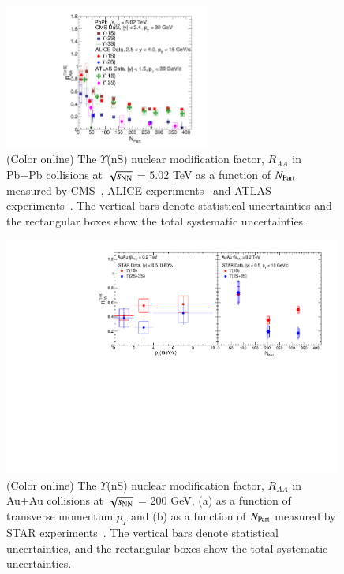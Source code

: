 \begin{figure}
  \begin{center}
  \includegraphics[width=0.6\textwidth]{Figures/Fig6_LHC_YnSRAANPart.pdf}
  \caption{(Color online) The $\Upsilon$(nS) nuclear modification factor, $R_{AA}$
   in Pb+Pb collisions at $\sqrt{s_{\rm NN}}$ = 5.02 TeV as a function of $N_{\rm Part}$
   measured by CMS~\cite{CMS:2018zza}, ALICE experiments~\cite{ALICE:2020wwx} and
   ATLAS experiments~\cite{ALICE:2020wwx}.
   The vertical bars denote statistical uncertainties and the rectangular boxes show
   the total systematic uncertainties.
  }
  \label{fig:LHCYnSRAANPart}
  \end{center}
\end{figure}



\begin{figure}
  \includegraphics[width=0.99\textwidth]{Figures/Fig7_RHIC_YnSRAAPt.pdf}
  \caption{(Color online) The $\Upsilon$(nS) nuclear modification factor, $R_{AA}$
in Au+Au collisions at $\sqrt{s_{\rm NN}}$ = 200 GeV,
     (a) as a function of transverse momentum $p_{T}$
    and (b) as a function of $N_{\rm Part}$ measured by STAR experiments~\cite{Wang:2019vau}. The vertical bars denote
    statistical uncertainties, and the rectangular boxes show the total systematic uncertainties.
  }
  \label{fig:RHICYnSRAAPt}
\end{figure}



